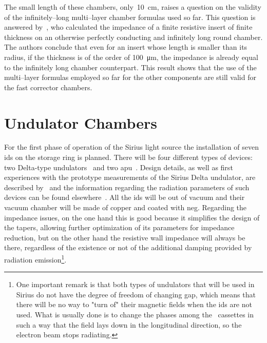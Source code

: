     The small length of these chambers, only~\SI{10}{\centi\meter}, raises a question on the validity of the infinitely--long multi--layer chamber formulas used so far. This question is answered by~, who calculated the impedance of a finite resistive insert of finite thickness on an otherwise perfectly conducting and infinitely long round chamber. The authors conclude that even for an insert whose length is smaller than its radius, if the thickness is of the order of \SI{100}{\micro\meter}, the impedance is already equal to the infinitely long chamber counterpart. This result shows that the use of the multi--layer formulas employed so far for the other components are still valid for the fast corrector chambers.

\section{Undulator Chambers}\label{sec:undulators_chambers}

    For the first phase of operation of the Sirius light source the installation of seven \glspl{id} on the storage ring is planned. There will be four different types of devices: two Delta-type undulators~\cite{Temnykh2008} and two \gls{apu}~\cite{Carr1991}. Design details, as well as first experiences with the prototype measurements of the Sirius Delta undulator, are described by~ and the information regarding the radiation parameters of such devices can be found elsewhere~\cite{Sirius2013}. All the \glspl{id} will be out of vacuum and their vacuum chamber will be made of copper and coated with \gls{neg}. Regarding the impedance issues, on the one hand this is good because it simplifies the design of the tapers, allowing further optimization of its parameters for impedance reduction, but on the other hand the resistive wall impedance will always be there, regardless of the existence or not of the additional damping provided by radiation emission\footnote{One important remark is that both types of undulators that will be used in Sirius do not have the degree of freedom of changing gap, which means that there will be no way to "turn of" their magnetic fields when the \glspl{id} are not used. What is usually done is to change the phases among the~ cassettes in such a way that the field lays down in the longitudinal direction, so the electron beam stops radiating.}.


